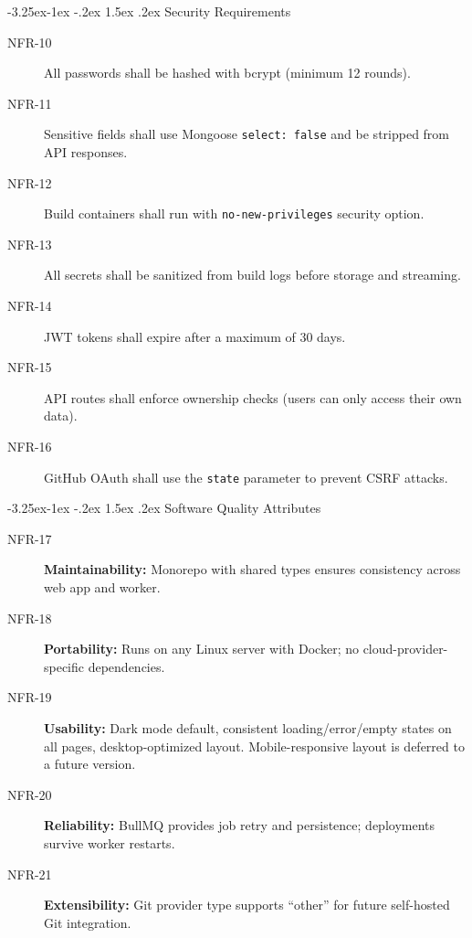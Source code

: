 \documentclass[12pt,a4paper]{article}
\makeatletter
\renewcommand\subsection{\@startsection{subsection}{2}{\z@}%
  {-3.25ex\@plus -1ex \@minus -.2ex}%
  {1.5ex \@plus .2ex}%
  {\needspace{2\baselineskip}\normalfont\large\bfseries}}
\makeatother
\begin{document}
\subsection{Security Requirements}
\begin{description}
    \item[NFR-10] All passwords shall be hashed with bcrypt (minimum 12 rounds).
    \item[NFR-11] Sensitive fields shall use Mongoose \texttt{select: false} and be stripped from API responses.
    \item[NFR-12] Build containers shall run with \texttt{no-new-privileges} security option.
    \item[NFR-13] All secrets shall be sanitized from build logs before storage and streaming.
    \item[NFR-14] JWT tokens shall expire after a maximum of 30 days.
    \item[NFR-15] API routes shall enforce ownership checks (users can only access their own data).
    \item[NFR-16] GitHub OAuth shall use the \texttt{state} parameter to prevent CSRF attacks.
\end{description}

\subsection{Software Quality Attributes}
\begin{description}
    \item[NFR-17] \textbf{Maintainability:} Monorepo with shared types ensures consistency across web app and worker.
    \item[NFR-18] \textbf{Portability:} Runs on any Linux server with Docker; no cloud-provider-specific dependencies.
    \item[NFR-19] \textbf{Usability:} Dark mode default, consistent loading/error/empty states on all pages, desktop-optimized layout. Mobile-responsive layout is deferred to a future version.
    \item[NFR-20] \textbf{Reliability:} BullMQ provides job retry and persistence; deployments survive worker restarts.
    \item[NFR-21] \textbf{Extensibility:} Git provider type supports ``other'' for future self-hosted Git integration.
\end{description}
\end{document}
